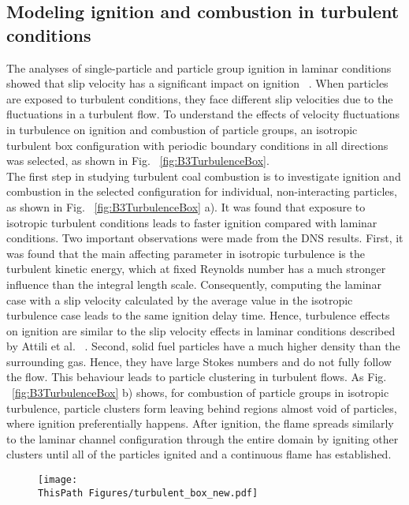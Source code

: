 \begin{btUnit}
\subsection{Modeling ignition and combustion in turbulent conditions} 
The analyses of single-particle and particle group ignition in laminar conditions showed that slip velocity has a significant impact on ignition ~\cite{Attili2020, Farazi2019b, Li2021}. When particles are exposed to turbulent conditions, they face different slip velocities due to the fluctuations in a turbulent flow. To understand the effects of velocity fluctuations in turbulence on ignition and combustion of particle groups, an isotropic turbulent box configuration with periodic boundary conditions in all directions was selected, as shown in Fig. ~\ref{fig:B3TurbulenceBox}.
\\
The first step in studying turbulent coal combustion is to investigate ignition and combustion in the selected configuration for individual, non-interacting particles, as shown in Fig. ~\ref{fig:B3TurbulenceBox} a). It was found that exposure to isotropic turbulent conditions leads to faster ignition compared with laminar conditions. Two important observations were made from the DNS results. First, it was found that the main affecting parameter in isotropic turbulence is the turbulent kinetic energy, which at fixed Reynolds number has a much stronger influence than the integral length scale. Consequently, computing the laminar case with a slip velocity calculated by the average value in the isotropic turbulence case leads to the same ignition delay time. Hence, turbulence effects on ignition are similar to the slip velocity effects in laminar conditions described by Attili et al. ~\cite{Attili2020}. Second, solid fuel particles have a much higher density than the surrounding gas. Hence, they have large Stokes numbers and do not fully follow the flow. This behaviour leads to particle clustering in turbulent flows. As Fig. ~\ref{fig:B3TurbulenceBox} b) shows, for combustion of particle groups in isotropic turbulence, particle clusters form leaving behind regions almost void of particles, where ignition preferentially happens. After ignition, the flame spreads similarly to the laminar channel configuration through the entire domain by igniting other clusters until all of the particles ignited and a continuous flame has established.
\begin{figure}
	\texttt{[image: \\ThisPath Figures/turbulent\_box\_new.pdf]}

\end{figure}
\end{btUnit}
